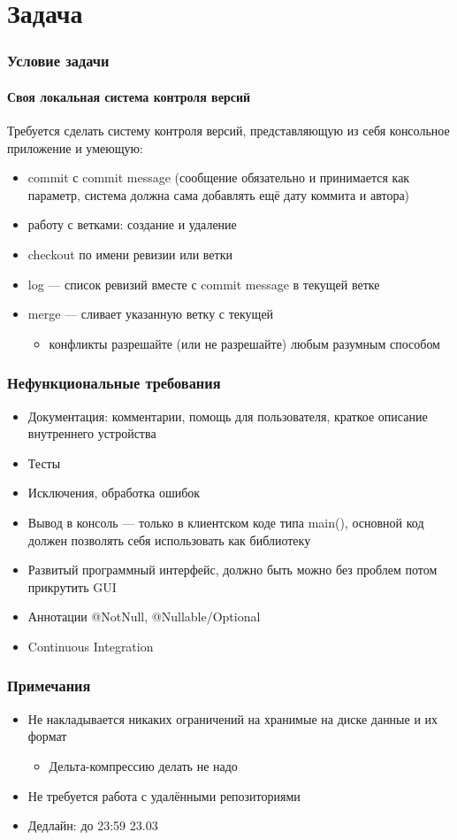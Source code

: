 \documentclass[xetex,mathserif,serif]{beamer}
\begin{document}
	\section{Задача}

	\begin{frame}
		\frametitle{Условие задачи}
		\framesubtitle{Своя локальная система контроля версий}
		Требуется сделать систему контроля версий, представляющую из себя консольное приложение и умеющую:
		\begin{itemize}
			\item commit с commit message (сообщение обязательно и принимается как параметр, система должна сама добавлять ещё дату коммита и автора)
			\item работу с ветками: создание и удаление
			\item checkout по имени ревизии или ветки
			\item log --- список ревизий вместе с commit message в текущей ветке
			\item merge --- сливает указанную ветку с текущей
			\begin{itemize}
				\item конфликты разрешайте (или не разрешайте) любым разумным способом
			\end{itemize}
		\end{itemize}
	\end{frame}

	\begin{frame}
		\frametitle{Нефункциональные требования}
		\begin{itemize}
			\item Документация: комментарии, помощь для пользователя, краткое описание внутреннего устройства
			\item Тесты
			\item Исключения, обработка ошибок
			\item Вывод в консоль --- только в клиентском коде типа main(), основной код должен позволять себя использовать как библиотеку
			\item Развитый программный интерфейс, должно быть можно без проблем потом прикрутить GUI
			\item Аннотации @NotNull, @Nullable/Optional
			\item Continuous Integration
		\end{itemize}
	\end{frame}

	\begin{frame}
		\frametitle{Примечания}
		\begin{itemize}
			\item Не накладывается никаких ограничений на хранимые на диске данные и их формат
			\begin{itemize}
				\item Дельта-компрессию делать не надо
			\end{itemize}
			\item Не требуется работа с удалёнными репозиториями
			\item Дедлайн: до 23:59 23.03
		\end{itemize}
	\end{frame}
\end{document}
